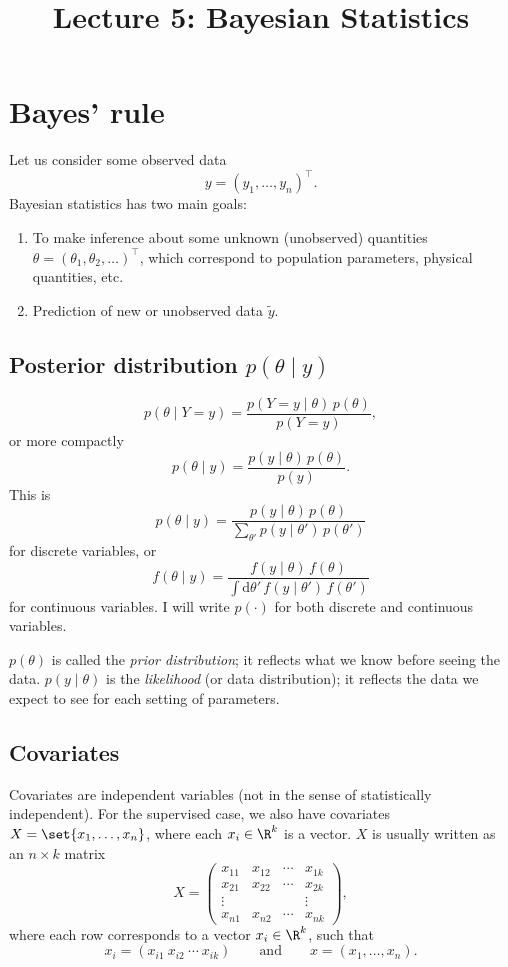 
\title{Lecture 5: Bayesian Statistics}
\author{}\date{}


\maketitle

\section{Bayes' rule}
Let us consider some observed data
\[
y = (y_1, \dots, y_n)^{\top}.
\]
Bayesian statistics has two main goals:
\begin{enumerate}[label=(\roman*)]
\item To make inference about some unknown (unobserved) quantities $\theta = (\theta_1, \theta_2, \dots)^{\top}$, which correspond to population parameters, physical quantities, etc.
\item Prediction of new or unobserved data $\tilde y$.
\end{enumerate}

\subsection{Posterior distribution $p(\theta \mid y)$}
\[
p(\theta \mid Y = y) = \frac{p(Y = y \mid \theta)\,p(\theta)}{p(Y = y)},
\]
or more compactly
\[
p(\theta \mid y) = \frac{p(y \mid \theta)\,p(\theta)}{p(y)}.
\]
This is
\[
p(\theta \mid y) = \frac{p(y \mid \theta)\,p(\theta)}{\sum_{\theta'} p(y \mid \theta')\,p(\theta')}
\]
for discrete variables, or
\[
f(\theta \mid y) = \frac{f(y \mid \theta)\,f(\theta)}{\int \mathrm{d}\theta'\,f(y \mid \theta')\,f(\theta')}
\]
for continuous variables. I will write $p(\cdot)$ for both discrete and continuous variables.

$p(\theta)$ is called the \emph{prior distribution}; it reflects what we know before seeing the data. $p(y \mid \theta)$ is the \emph{likelihood} (or data distribution); it reflects the data we expect to see for each setting of parameters.

\subsection{Covariates}
Covariates are independent variables (not in the sense of statistically independent). For the supervised case, we also have covariates $X = \set{x_1, \dots, x_n}$, where each $x_i \in \R^k$ is a vector. $X$ is usually written as an $n\times k$ matrix
\[
X = \begin{pmatrix}
x_{11} & x_{12} & \cdots & x_{1k}\\
x_{21} & x_{22} & \cdots & x_{2k}\\
\vdots & & & \vdots\\
x_{n1} & x_{n2} & \cdots & x_{nk}
\end{pmatrix},
\]
where each row corresponds to a vector $x_i \in \R^k$, such that
\[
x_i = (x_{i1}\ x_{i2}\ \cdots\ x_{ik}) \qquad\text{and}\qquad x = (x_1, \dots, x_n).
\]

